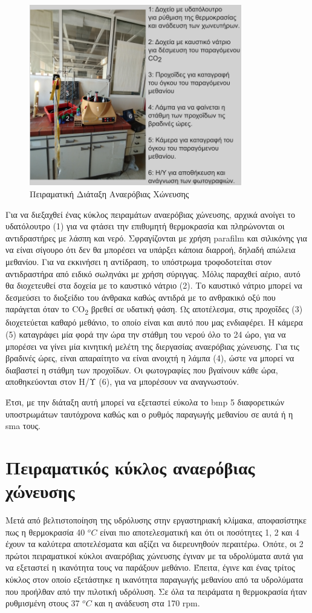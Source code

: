 \documentclass[11pt]{report}
\begin{document}
\begin{figure}[htbp]
\centering
\includegraphics[width=350px]{./anaerobic_digestion_captioned.png}
\caption{\label{fig:org98a9629}Πειραματική Διάταξη Αναερόβιας Χώνευσης}
\end{figure}

Για να διεξαχθεί ένας κύκλος πειραμάτων αναερόβιας χώνευσης, αρχικά ανοίγει το υδατόλουτρο (1) για να φτάσει την επιθυμητή θερμοκρασία και πληρώνονται οι αντιδραστήρες με λάσπη και νερό. Σφραγίζονται με χρήση parafilm και σιλικόνης για να είναι σίγουρο ότι δεν θα μπορέσει να υπάρξει κάποια διαρροή, δηλαδή απώλεια μεθανίου. Για να εκκινήσει η αντίδραση, το υπόστρωμα τροφοδοτείται στον αντιδραστήρα από ειδικό σωληνάκι με χρήση σύριγγας. Μόλις παραχθεί αέριο, αυτό θα διοχετευθεί στα δοχεία με το καυστικό νάτριο (2). Το καυστικό νάτριο μπορεί να δεσμεύσει το διοξείδιο του άνθρακα καθώς αντιδρά με το ανθρακικό οξύ που παράγεται όταν το CO\textsubscript{2} βρεθεί σε υδατική φάση. Ως αποτέλεσμα, στις προχοΐδες (3) διοχετεύεται καθαρό μεθάνιο, το οποίο είναι και αυτό που μας ενδιαφέρει. Η κάμερα (5) καταγράφει μία φορά την ώρα την στάθμη του νερού όλο το 24 ώρο, για να μπορέσει να γίνει μία κινητική μελέτη της διεργασίας αναερόβιας χώνευσης. Για τις βραδινές ώρες, είναι απαραίτητο να είναι ανοιχτή η λάμπα (4), ώστε να μπορεί να διαβαστεί η στάθμη των προχοΐδων. Οι φωτογραφίες που βγαίνουν κάθε ώρα, αποθηκεύονται στον Η/Υ (6), για να μπορέσουν να αναγνωστούν.

Έτσι, με την διάταξη αυτή μπορεί να εξεταστεί εύκολα το \acrfull{bmp} 5 διαφορετικών υποστρωμάτων ταυτόχρονα καθώς και ο ρυθμός παραγωγής μεθανίου σε αυτά ή η \acrfull{sma} τους. 

\section{Πειραματικός κύκλος αναερόβιας χώνευσης}
\label{sec:org5060e2c}
Μετά από βελτιστοποίηση της υδρόλυσης στην εργαστηριακή κλίμακα, αποφασίστηκε πως η θερμοκρασία 40 \(^oC\) είναι πιο αποτελεσματική και ότι οι ποσότητες 1, 2 και 4 έχουν τα καλύτερα αποτελέσματα και αξίζει να διερευνηθούν περαιτέρω. Οπότε, οι 2 πρώτοι πειραματικοί κύκλοι αναερόβιας χώνευσης έγιναν με τα υδρολύματα αυτά για να εξεταστεί η ικανότητα τους να παράξουν μεθάνιο. Έπειτα, έγινε και ένας τρίτος κύκλος στον οποίο εξετάστηκε η ικανότητα παραγωγής μεθανίου από τα υδρολύματα που προήλθαν από την πιλοτική υδρόλυση. Σε όλα τα πειράματα η θερμοκρασία ήταν ρυθμισμένη στους 37 \(^oC\) και η ανάδευση στα 170 rpm.
\end{document}
